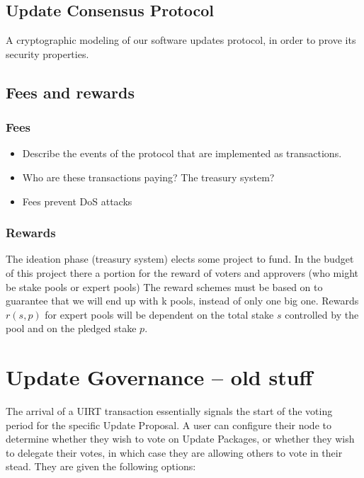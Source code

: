 
\subsection{Update Consensus Protocol}
A cryptographic modeling of our software updates protocol, in order to prove its security properties. 

\subsection{Fees and rewards}
\subsubsection{Fees}
\begin{itemize}
\item Describe the events of the protocol that are implemented as transactions. 
\item Who are these transactions paying? The treasury system?
\item Fees prevent DoS attacks
\end{itemize}

\subsubsection{Rewards}
The ideation phase (treasury system) elects some project to fund. In the budget of this project there a portion for the reward of voters and approvers (who might be stake pools or expert pools)
The reward schemes must be based on \cite{incentives} to guarantee that we will end up with k pools, instead of only one big one.
Rewards $r(s,p)$ for expert pools will be dependent on the total stake $s$ controlled by the pool and on the pledged stake $p$.


\section*{Update Governance -- old stuff}
The arrival of a UIRT transaction essentially signals the start of the voting period for the specific Update Proposal. A user can configure their node to determine whether they wish to vote on Update Packages, or whether they wish to delegate their votes, in which case they are allowing others to vote in their stead. They are given the following options:

